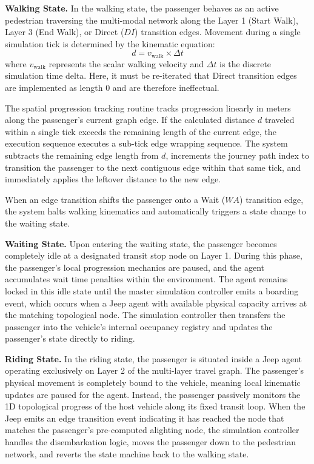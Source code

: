 {{\textbf{Walking State.} In the walking state, the passenger behaves as an active pedestrian traversing the multi-modal network along the Layer 1 (Start Walk), Layer 3 (End Walk), or Direct ($DI$) transition edges. Movement during a single simulation tick is determined by the kinematic equation:
\begin{equation}
d = v_{\text{walk}} \times \Delta t
\end{equation}
where $v_{\text{walk}}$ represents the scalar walking velocity and $\Delta t$ is the discrete simulation time delta. Here, it must be re-iterated that Direct transition edges are implemented as length 0 and are therefore ineffectual.

The spatial progression tracking routine tracks progression linearly in meters along the passenger's current graph edge. If the calculated distance $d$ traveled within a single tick exceeds the remaining length of the current edge, the execution sequence executes a sub-tick edge wrapping sequence. The system subtracts the remaining edge length from $d$, increments the journey path index to transition the passenger to the next contiguous edge within that same tick, and immediately applies the leftover distance to the new edge.

When an edge transition shifts the passenger onto a Wait ($WA$) transition edge, the system halts walking kinematics and automatically triggers a state change to the waiting state.

\textbf{Waiting State.} Upon entering the waiting state, the passenger becomes completely idle at a designated transit stop node on Layer 1. During this phase, the passenger's local progression mechanics are paused, and the agent accumulates wait time penalties within the environment. The agent remains locked in this idle state until the master simulation controller emits a boarding event, which occurs when a Jeep agent with available physical capacity arrives at the matching topological node. The simulation controller then transfers the passenger into the vehicle's internal occupancy registry and updates the passenger's state directly to riding.

\textbf{Riding State.} In the riding state, the passenger is situated inside a Jeep agent operating exclusively on Layer 2 of the multi-layer travel graph. The passenger's physical movement is completely bound to the vehicle, meaning local kinematic updates are paused for the agent. Instead, the passenger passively monitors the 1D topological progress of the host vehicle along its fixed transit loop. When the Jeep emits an edge transition event indicating it has reached the node that matches the passenger's pre-computed alighting node, the simulation controller handles the disembarkation logic, moves the passenger down to the pedestrian network, and reverts the state machine back to the walking state.

}}
